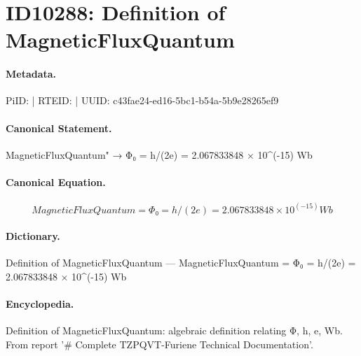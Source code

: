\section*{ID10288: Definition of MagneticFluxQuantum}
\paragraph{Metadata.}
PiID:  | RTEID:  | UUID: c43fae24-ed16-5bc1-b54a-5b9e28265ef9

\paragraph{Canonical Statement.}
MagneticFluxQuantum" → Φ₀ = h/(2e) = 2.067833848 × 10\textasciicircum{}(-15) Wb

\paragraph{Canonical Equation.}
\[
MagneticFluxQuantum = Φ₀ = h/(2e) = 2.067833848 × 10^(-15) Wb
\]

\paragraph{Dictionary.}
Definition of MagneticFluxQuantum — MagneticFluxQuantum = Φ₀ = h/(2e) = 2.067833848 × 10\textasciicircum{}(-15) Wb

\paragraph{Encyclopedia.}
Definition of MagneticFluxQuantum: algebraic definition relating Φ, h, e, Wb. From report '\# Complete TZPQVT-Furiene Technical Documentation'.
